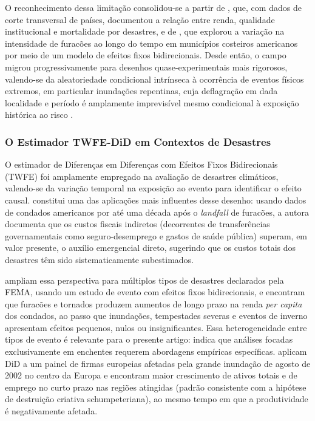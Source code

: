\documentclass[a4paper,12pt]{article}
\begin{document}
O reconhecimento dessa limitação consolidou-se a partir de ,
que, com dados de corte transversal de países, documentou a relação entre renda,
qualidade institucional e mortalidade por desastres, e de , que
explorou a variação na intensidade de furacões ao longo do tempo em municípios costeiros
americanos por meio de um modelo de efeitos fixos bidirecionais. Desde então, o campo
migrou progressivamente para desenhos quase-experimentais mais rigorosos, valendo-se
da aleatoriedade condicional intrínseca à ocorrência de eventos físicos extremos, em
particular inundações repentinas, cuja deflagração em dada localidade e período é
amplamente imprevisível mesmo condicional à exposição histórica ao risco
\cite{elsner2024}.

\subsubsection{O Estimador TWFE-DiD em Contextos de Desastres}

O estimador de Diferenças em Diferenças com Efeitos Fixos Bidirecionais (TWFE) foi
amplamente empregado na avaliação de desastres climáticos, valendo-se da variação
temporal na exposição ao evento para identificar o efeito causal. 
constitui uma das aplicações mais influentes desse desenho: usando dados de condados
americanos por até uma década após o \textit{landfall} de furacões, a autora documenta
que os custos fiscais indiretos (decorrentes de transferências governamentais como
seguro-desemprego e gastos de saúde pública) superam, em valor presente, o auxílio
emergencial direto, sugerindo que os custos totais dos desastres têm sido sistematicamente
subestimados.

 ampliam essa perspectiva para múltiplos tipos de desastres
declarados pela FEMA, usando um estudo de evento com efeitos fixos bidirecionais, e
encontram que furacões e tornados produzem aumentos de longo prazo na renda
\textit{per capita} dos condados, ao passo que inundações, tempestades severas e eventos
de inverno apresentam efeitos pequenos, nulos ou insignificantes. Essa heterogeneidade
entre tipos de evento é relevante para o presente artigo: indica que análises focadas
exclusivamente em enchentes requerem abordagens empíricas específicas.
 aplicam DiD a um painel de firmas europeias afetadas pela grande
inundação de agosto de 2002 no centro da Europa e encontram maior crescimento de ativos
totais e de emprego no curto prazo nas regiões atingidas (padrão consistente com a
hipótese de destruição criativa schumpeteriana), ao mesmo tempo em que a
produtividade é negativamente afetada.
\end{document}
